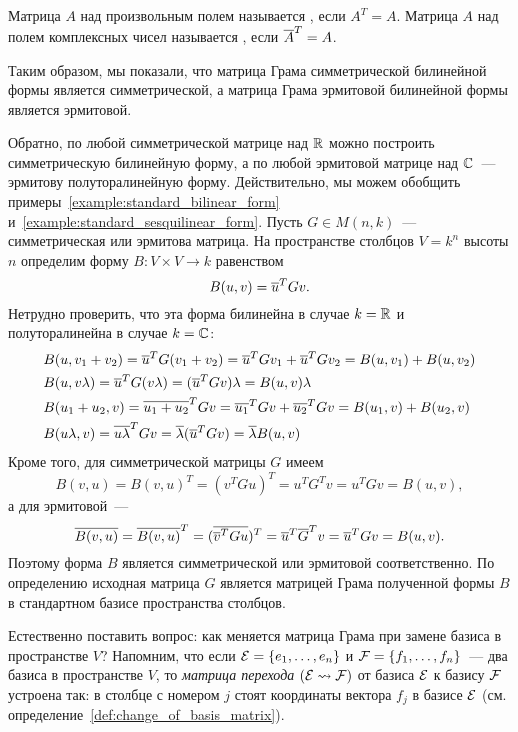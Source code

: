 \begin{definition}
Матрица $A$ над произвольным полем называется ,
если $A^T = A$. Матрица $A$ над полем комплексных чисел называется
, если $\overline{A}^T = A$.
\end{definition}

Таким образом, мы показали, что матрица Грама симметрической
билинейной формы является симметрической, а матрица Грама эрмитовой
билинейной формы является эрмитовой.

Обратно, по любой симметрической матрице над $\mathbb R$ можно построить
симметрическую билинейную форму, а по любой эрмитовой матрице над $\mathbb
C$~--- эрмитову полуторалинейную форму. Действительно, мы можем
обобщить примеры~\ref{example:standard_bilinear_form}
и~\ref{example:standard_sesquilinear_form}.
Пусть $G\in M(n,k)$~--- симметрическая или эрмитова матрица. На
пространстве столбцов $V=k^n$ высоты $n$ определим форму
$B\colon V\times V\to k$ равенством
$$
B(u,v) = \overline{u}^TGv.
$$
Нетрудно проверить, что эта форма билинейна в случае $k=\mathbb R$ и
полуторалинейна в случае $k=\mathbb C$:
\begin{align*}
&B(u,v_1+v_2) = \overline{u}^T G(v_1+v_2) = \overline{u}^TGv_1 + \overline{u}^TGv_2 =
B(u,v_1) + B(u,v_2)\\
&B(u,v\lambda) = \overline{u}^T G(v\lambda) = (\overline{u}^TGv)\lambda = B(u,v)\lambda\\
&B(u_1+u_2,v) = \overline{u_1+u_2}^T Gv = \overline{u_1}^TGv + \overline{u_2}^TGv =
B(u_1,v) + B(u_2,v)\\
&B(u\lambda,v) = \overline{u\lambda}^T Gv = \overline\lambda(\overline{u}^TGv) =
\overline\lambda B(u,v)
\end{align*}
Кроме того, для симметрической матрицы $G$ имеем
$$
B(v,u) = B(v,u)^T = (v^T G u)^T = u^TG^Tv = u^TGv = B(u,v),
$$
а для эрмитовой~---
$$
\overline{B(v,u)} = \overline{B(v,u)}^T = (\overline{\overline{v}^TGu})^T = \overline{u}^T\overline{G}^Tv
= \overline{u}^T G v = B(u,v).
$$
Поэтому форма $B$ является симметрической или эрмитовой
соответственно. По определению исходная матрица $G$ является матрицей
Грама полученной формы $B$ в стандартном базисе пространства столбцов.

Естественно поставить вопрос: как меняется матрица Грама при замене
базиса в пространстве $V$?
Напомним, что если $\mathcal E=\{e_1,\dots,e_n\}$ и $\mathcal F=
\{f_1,\dots,f_n\}$~--- два базиса в пространстве $V$, то {\it
  матрица перехода} $(\mathcal E\rightsquigarrow\mathcal F)$ от базиса $\mathcal E$ к базису
$\mathcal F$ устроена так:
в столбце с номером $j$ стоят координаты вектора $f_j$ в базисе $\mathcal E$
(см. определение~\ref{def:change_of_basis_matrix}).

